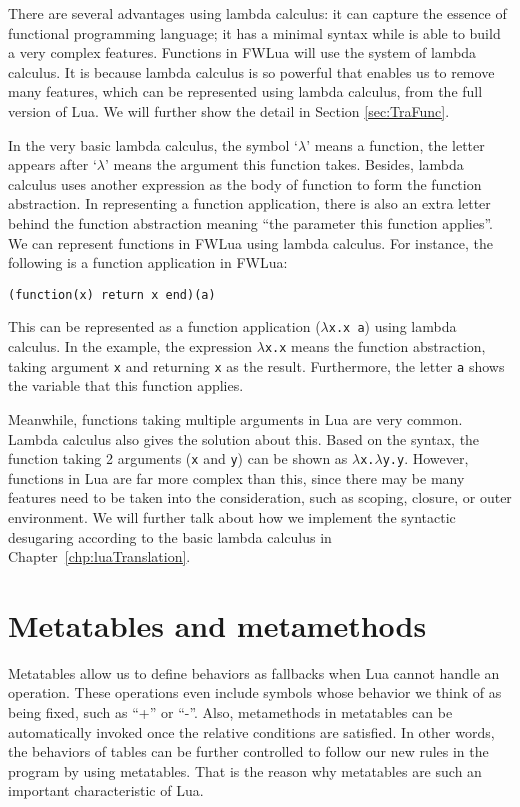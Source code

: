 There are several advantages using lambda calculus: it can capture the essence of functional programming language; it has a minimal syntax while is able to build a very complex features. Functions in FWLua will use the system of lambda calculus. It is because lambda calculus is so powerful that enables us to remove many features, which can be represented using lambda calculus, from the full version of Lua. We will further show the detail in Section \ref{sec:TraFunc}.

In the very basic lambda calculus, the symbol `$\lambda$' means a function, the letter appears after `$\lambda$' means the argument this function takes.
Besides, lambda calculus uses another expression as the body of function to form the function abstraction. In representing a function application, there is also an extra letter behind the function abstraction meaning ``the parameter this function applies''. We can represent functions in FWLua using lambda calculus. For instance, the following is a function application in FWLua:

\begin{verbatim}
(function(x) return x end)(a)
\end{verbatim}

This can be represented as a function application ({\tt $\lambda$x.x a}) using lambda calculus. In the example, the expression {\tt $\lambda$x.x} means the function abstraction, taking argument {\tt x} and returning {\tt x} as the result. Furthermore, the letter {\tt a} shows the variable that this function applies.

Meanwhile, functions taking multiple arguments in Lua are very common. Lambda calculus also gives the solution about this. Based on the syntax, the function taking 2 arguments ({\tt x} and {\tt y}) can be shown as {\tt $\lambda$x.$\lambda$y.y}. However, functions in Lua are far more complex than this, since there may be many features need to be taken into the consideration, such as scoping, closure, or outer environment. We will further talk about how we implement the syntactic desugaring according to the basic lambda calculus in Chapter~\ref{chp:luaTranslation}.


\section{Metatables and metamethods}
Metatables allow us to define behaviors as fallbacks when Lua cannot handle an operation. These operations even include symbols whose behavior we think of as being fixed, such as ``+'' or ``-''.
Also, metamethods in metatables can be automatically invoked once the relative conditions are satisfied. In other words, the behaviors of tables can be further controlled to follow our new rules in the program by using metatables. That is the reason why metatables are such an important characteristic of Lua.

